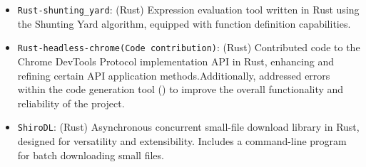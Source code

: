 \documentclass[zh]{resume}
\begin{document}
\begin{itemize}
	\item {} {\texttt{Rust-shunting\_yard}}:
	(Rust)
Expression evaluation tool written in Rust using the Shunting Yard algorithm, equipped with function definition capabilities.
	\item {} {\texttt{Rust-headless-chrome(Code contribution)}}:
	(Rust)
	Contributed code to the Chrome DevTools Protocol implementation API in Rust, enhancing and refining certain API application methods.Additionally, addressed errors within the code generation tool () to improve the overall functionality and reliability of the project.
	\item {} {\texttt{ShiroDL}}:
	(Rust)
Asynchronous concurrent small-file download library in Rust, designed for versatility and extensibility. Includes a command-line program for batch downloading small files.

\end{itemize}
\end{document}
